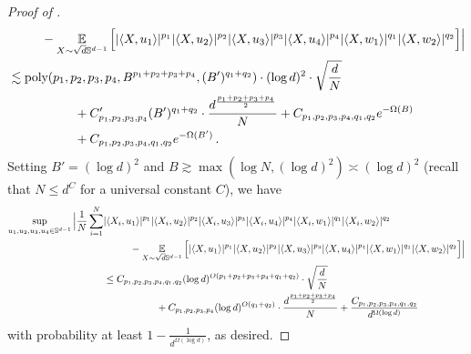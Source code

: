 \begin{proof}[Proof of ]
\begin{align}
& \,\,\,\,\,\,\,\,\,\,\,\,\,\,\,\, - \operatorname*{\mathbb{E}}_{X \sim \sqrt{d} \mathbb{S}^{d - 1}} \Big[ |\langle X, u_1 \rangle|^{p_1} |\langle X, u_2 \rangle|^{p_2} |\langle X, u_3 \rangle|^{p_3} |\langle X, u_4 \rangle|^{p_4} |\langle X, w_1 \rangle|^{q_1} |\langle X, w_2 \rangle|^{q_2} \Big] \Big| \\
& \lesssim \textup{poly}(p_1, p_2, p_3, p_4, B^{p_1 + p_2 + p_3 + p_4}, (B')^{q_1 + q_2}) \cdot (\log d)^2 \cdot \sqrt{\frac{d}{N}} \\
& \,\,\,\,\,\,\,\,\,\,\,\,\,\,\,\,\,\,\,\,\,\,\,\,\,\,\,\,\,\,\,\, + C_{p_1, p_2, p_3, p_4}' (B')^{q_1 + q_2} \cdot \frac{d^{\frac{p_1 + p_2 + p_3 + p_4}{2}}}{N} + C_{p_1, p_2, p_3, p_4, q_1, q_2} e^{-\Omega(B)} \\
& \,\,\,\,\,\,\,\,\,\,\,\,\,\,\,\,\,\,\,\,\,\,\,\,\,\,\,\,\,\,\,\, + C_{p_1, p_2, p_3, p_4, q_1, q_2} e^{-\Omega(B')} \,.
\end{align}
Setting $B' = (\log d)^2$ and $B \gtrsim \max(\log N, (\log d)^2) \asymp (\log d)^2$ (recall that $N \leq d^C$ for a universal constant $C$), we have
\begin{align}
\sup_{u_1, u_2, u_3, u_4 \in \mathbb{S}^{d - 1}} \Big|\frac{1}{N} \sum_{i = 1}^N & |\langle X_i, u_1 \rangle|^{p_1} |\langle X_i, u_2 \rangle|^{p_2} |\langle X_i, u_3 \rangle|^{p_3} |\langle X_i, u_4 \rangle|^{p_4} |\langle X_i, w_1 \rangle|^{q_1} |\langle X_i, w_2 \rangle|^{q_2} \\
& \,\,\,\,\,\,\,\,\,\,\,\,\,\,\,\, - \operatorname*{\mathbb{E}}_{X \sim \sqrt{d} \mathbb{S}^{d - 1}} \Big[ |\langle X, u_1 \rangle|^{p_1} |\langle X, u_2 \rangle|^{p_2} |\langle X, u_3 \rangle|^{p_3} |\langle X, u_4 \rangle|^{p_4} |\langle X, w_1 \rangle|^{q_1} |\langle X, w_2 \rangle|^{q_2} \Big] \Big| \\
& \leq C_{p_1, p_2, p_3, p_4, q_1, q_2} (\log d)^{O(p_1 + p_2 + p_3 + p_4 + q_1 + q_2)} \cdot \sqrt{\frac{d}{N}} \\
& \,\,\,\,\,\,\,\,\,\,\,\,\,\,\,\,\,\,\,\,\,\,\,\,\,\,\,\,\,\,\,\, + C_{p_1, p_2, p_3, p_4} (\log d)^{O(q_1 + q_2)} \cdot \frac{d^{\frac{p_1 + p_2 + p_3 + p_4}{2}}}{N} + \frac{C_{p_1, p_2, p_3, p_4, q_1, q_2}}{d^{\Omega(\log d)}}
\end{align}
with probability at least $1 - \frac{1}{d^{\Omega(\log d)}}$, as desired.
\end{proof}

